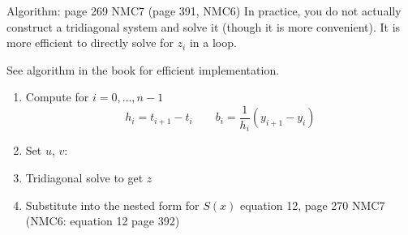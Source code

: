\documentclass[10pt]{beamer}
\begin{document}
\begin{frame}{Algorithm: page 269 NMC7 (page 391, NMC6)}
In practice, you do not actually construct a tridiagonal system and solve it (though it is more convenient). It is more efficient to directly solve for  $z_i$ in a loop. \bigskip

See algorithm in the book for efficient implementation. \bigskip 

\begin{enumerate}
  \item Compute for $i=0,\dots,n-1$
  \begin{equation*}
  h_i=t_{i+1}-t_i\qquad b_i=\frac{1}{h_i}(y_{i+1}-y_{i})
  \end{equation*}
  \item Set $u$, $v$:
  \item Tridiagonal solve to get $z$
  \item Substitute into the nested form for $S(x)$ equation 12, page 270 NMC7 (NMC6: equation 12 page 392)
\end{enumerate}
\end{frame}
\end{document}
